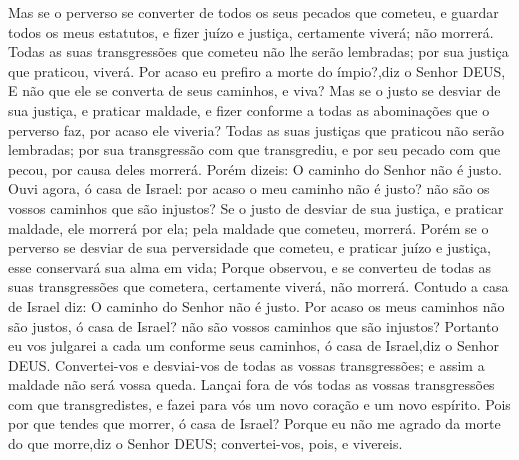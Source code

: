 {Mas se o perverso se converter de todos os seus pecados que cometeu, e
{} guardar todos os meus estatutos, e fizer juízo e justiça, certamente viverá; não morrerá.
Todas as suas transgressões que cometeu não lhe serão lembradas; por sua justiça que praticou, viverá.
Por acaso eu prefiro
 a morte do ímpio?,diz o Senhor DEUS, E não que ele se converta de seus caminhos, e viva?
Mas se o justo se desviar de sua justiça, e
{} praticar maldade, e fizer conforme a todas as abominações que o perverso faz, por acaso ele viveria? Todas as suas justiças que praticou não serão lembradas; por sua transgressão com que transgrediu, e por seu pecado com que pecou, por causa deles
 morrerá.
Porém dizeis: O caminho do Senhor não é justo. Ouvi agora, ó casa de Israel: por acaso o meu caminho não é justo?
{} não são os vossos caminhos que são injustos?
Se o justo de desviar de sua justiça, e
{} praticar maldade, ele morrerá por ela; pela maldade que cometeu, morrerá.
Porém se o perverso se desviar de sua perversidade que cometeu, e
{} praticar juízo e justiça, esse conservará sua alma em vida;
Porque observou, e se converteu de todas as suas transgressões que cometera, certamente viverá, não morrerá.
Contudo a casa de Israel diz: O caminho do Senhor não é justo. Por acaso os meus caminhos não são justos, ó casa de Israel?
{} não são vossos caminhos que são injustos?
Portanto eu vos julgarei a cada um conforme seus
{} caminhos, ó casa de Israel,diz o Senhor DEUS. Convertei-vos e desviai-vos de todas as vossas transgressões; e assim a maldade não será vossa queda.
Lançai fora de vós todas as vossas transgressões com que transgredistes, e fazei para vós um novo coração e um novo espírito. Pois por que tendes que morrer, ó casa de Israel?
Porque eu não me agrado da morte do que morre,diz o Senhor DEUS; convertei-vos, pois, e vivereis.

}

